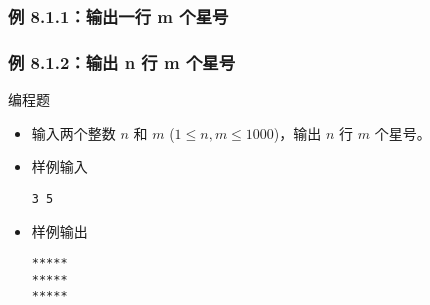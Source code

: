 \begin{frame}[fragile]
    \frametitle{例 8.1.1：输出一行 m 个星号}

\end{frame}

\begin{frame}[fragile]
    \frametitle{例 8.1.2：输出 n 行 m 个星号}


    \begin{exampleblock}{编程题}

        \begin{itemize}
            \item 输入两个整数 $n$ 和 $m$ ($1 \le n, m \le 1000$)，输出 $n$ 行 $m$ 个星号。

            \item 样例输入

                \lstinline|3 5|

            \item 样例输出

                \lstinline|*****|\\
                \lstinline|*****|\\
                \lstinline|*****|

        \end{itemize}

    \end{exampleblock}

\end{frame}

